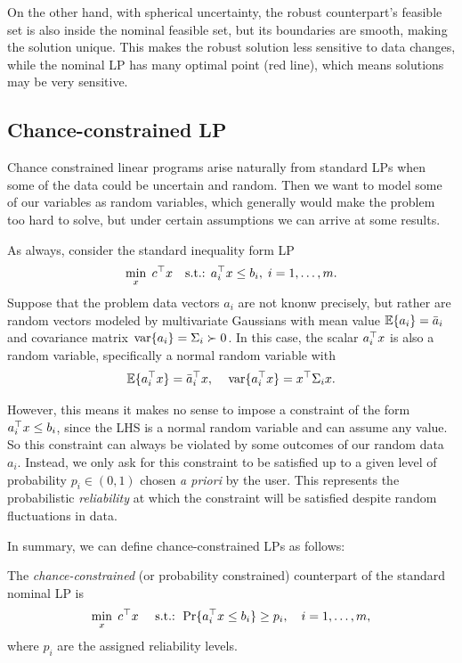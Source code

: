 \documentclass[11 pt]{scrartcl}
\begin{document}
On the other hand, with spherical uncertainty, the robust counterpart's feasible set is also inside the nominal feasible set, but its boundaries are smooth, making the solution unique. 
This makes the robust solution less sensitive to data changes, while the nominal LP has many optimal point (red line), which means solutions may be very sensitive. 

\subsection{Chance-constrained LP}
Chance constrained linear programs arise naturally from standard LPs when some of the data could be uncertain and random. 
Then we want to model some of our variables as random variables, which generally would make the problem too hard to solve, but under certain assumptions we can arrive at some results.

As always, consider the standard inequality form LP 
\[ \min_x\; c^\top x \quad \text{s.t.: } a_i^\top x \leq b_i, \; i = 1,\dots, m.\] 
Suppose that the problem data vectors $a_i$ are not knonw precisely, but rather are random vectors modeled by multivariate Gaussians with mean value $\mathbb E\{a_i\} = \bar{a}_i$ and covariance matrix $\,\text{var}\{a_i\} = \Sigma_i \succ 0$. 
In this case, the scalar $a_i^\top x$ is also a random variable, specifically a normal random variable with 
\[ \mathbb E\{a_i^\top x\} = \bar{a}_i^\top x, \quad \,\text{var}\{a_i^\top x\} = x^\top \Sigma_i x.\] 

However, this means it makes no sense to impose a constraint of the form $a_i^\top x\leq b_i$, since the LHS is a normal random variable and can assume any value. 
So this constraint can always be violated by some outcomes of our random data $a_i$. 
Instead, we only ask for this constraint to be satisfied up to a given level of probability $p_i \in (0,1)$ chosen \emph{a priori} by the user. 
This represents the probabilistic \emph{reliability} at which the constraint will be satisfied despite random fluctuations in data. 

In summary, we can define chance-constrained LPs as follows: 
\begin{definition}
    The \emph{chance-constrained} (or probability constrained) counterpart of the standard nominal LP is 
    \begin{align}
    \min_x\; c^\top x \quad\text{ s.t.: } \Pr\{a_i^\top x \leq b_i\} \geq p_i, \quad i = 1,\dots, m,
    \label{eq:chanceLP}
    \end{align}
where $p_i$ are the assigned reliability levels. 
\end{definition}
\end{document}

